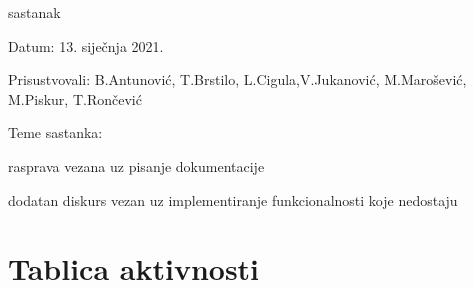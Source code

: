 \begin{packed_enum}
			\item  sastanak
			\item[] \begin{packed_item}
				\item Datum: 13. siječnja 2021.
				\item Prisustvovali: B.Antunović, T.Brstilo, L.Cigula,V.Jukanović, M.Marošević, M.Piskur, T.Rončević
				\item Teme sastanka:
				\begin{packed_item}
					\item  rasprava vezana uz pisanje dokumentacije
					\item  dodatan diskurs vezan uz implementiranje funkcionalnosti koje nedostaju
				\end{packed_item}
			\end{packed_item}
			
			
		\end{packed_enum}
		
		\eject
		\section*{Tablica aktivnosti}
			
